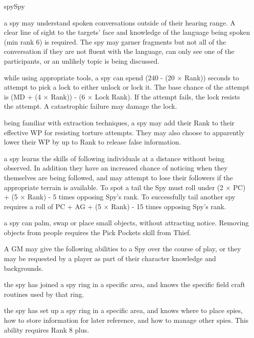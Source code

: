 \begin{Skill}[2.0]{spy}{Spy}
\begin{Description}
\item[Lip Reading] a spy may understand spoken conversations outside
  of their hearing range.  A clear line of sight to the targets’ face
  and knowledge of the language being spoken (min rank 6) is required.
  The spy may garner fragments but not all of the conversation if they
  are not fluent with the language, can only see one of the
  participants, or an unlikely topic is being discussed.

\item[Pick Locks] while using appropriate tools, a spy can spend (240
  - (20 × Rank)) seconds to attempt to pick a lock to either unlock or
  lock it. The base chance of the attempt is (MD + (4 × Rank)) - (6 ×
  Lock Rank). If the attempt fails, the lock resists the attempt.  A
  catastrophic failure may damage the lock.

\item[Resist Torture] being familiar with extraction techniques, a spy
  may add their Rank to their effective WP for resisting torture
  attempts.  They may also choose to apparently lower their WP by up
  to Rank to release false information.

\item[Shadowing] a spy learns the skills of following individuals at a
  distance without being observed. In addition they have an increased
  chance of noticing when they themselves are being followed, and may
  attempt to lose their followers if the appropriate terrain is
  available. To spot a tail the Spy must roll under (2 × PC) + (5 ×
  Rank) - 5 times opposing Spy’s rank.  To successfully tail another
  spy requires a roll of PC + AG + (5 × Rank) - 15 times opposing Spy’s
  rank.

\item[Sleight of Hand] a spy can palm, swap or place small objects,
  without attracting notice.  Removing objects from people requires
  the Pick Pockets skill from Thief.
\end{Description}

A GM may give the following abilities to a Spy over the course of
play, or they may be requested by a player as part of their character
knowledge and backgrounds.

\begin{Description}

\item[Network (area)] the spy has joined a spy ring in a specific
  area, and knows the specific field craft routines used by that ring.

\item[Spy Master (area)] the spy has set up a spy ring in a specific
  area, and knows where to place spies, how to store information for
  later reference, and how to manage other spies.  This ability
  requires Rank 8 plus.

\end{Description}

\end{Skill}

